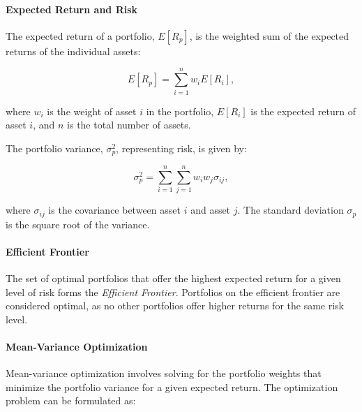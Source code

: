 \paragraph{Expected Return and Risk}

The expected return of a portfolio, $E[R_p]$, is the weighted sum of the expected returns of the individual assets:

\begin{equation}
    E[R_p] = \sum_{i=1}^{n} w_i E[R_i],
\end{equation}

where $w_i$ is the weight of asset $i$ in the portfolio, $E[R_i]$ is the expected return of asset $i$, and $n$ is the total number of assets.

The portfolio variance, $\sigma_p^2$, representing risk, is given by:

\begin{equation}
    \sigma_p^2 = \sum_{i=1}^{n} \sum_{j=1}^{n} w_i w_j \sigma_{ij},
\end{equation}

where $\sigma_{ij}$ is the covariance between asset $i$ and asset $j$. The standard deviation $\sigma_p$ is the square root of the variance.

\paragraph{Efficient Frontier}

The set of optimal portfolios that offer the highest expected return for a given level of risk forms the \textit{Efficient Frontier}. Portfolios on the efficient frontier are considered optimal, as no other portfolios offer higher returns for the same risk level.


\paragraph{Mean-Variance Optimization}

Mean-variance optimization involves solving for the portfolio weights that minimize the portfolio variance for a given expected return. The optimization problem can be formulated as:

